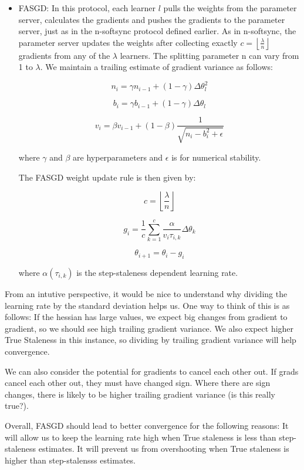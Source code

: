 \documentclass{article} %
\begin{document}
\begin{itemize}
\item FASGD: In this protocol, each learner $l$ pulls the weights from the parameter server,
  calculates the gradients and pushes the gradients to the parameter server,
  just as in the n-softsync protocol defined earlier.
  As in n-softsync, the parameter server updates
  the weights after collecting exactly
  $c = \left \lfloor{\frac{\lambda}{n}}\right \rfloor $
  gradients from any of the $\lambda$ learners.
  The splitting parameter n can vary from 1 to $\lambda$.
  We maintain a trailing estimate of gradient variance as follows:

  $$ n_i = \gamma n_{i-1} + (1 - \gamma) \Delta \theta_l^2 $$

  $$ b_i = \gamma b_{i-1} + (1 - \gamma) \Delta \theta_l $$

  $$ v_i = \beta  v_{i-1} + (1 - \beta)  \frac{1}{\sqrt{n_i - b_i^2 + \epsilon}}$$
  
  where $\gamma$ and $\beta$ are hyperparameters and $\epsilon$ is for numerical
  stability.

  The FASGD weight update rule is then given by:

  $$c = \left \lfloor{\frac{\lambda}{n}}\right \rfloor $$

  $$  g_i = \frac{1}{c} \sum_{k = 1}^{c} \frac{\alpha}{v_i \tau_{i,k}}\Delta \theta_k$$

  $$ \theta_{i + 1} = \theta_{i} - g_i $$

  where $\alpha(\tau_{i,k})$ is the step-staleness dependent learning rate.  
  
\end{itemize}
From an intutive perspective, it would be nice to understand why
dividing the learning rate by the standard deviation helps us.
One way to think of this is as follows:
If the hessian has large values, we expect big changes from gradient to gradient,
so we should see high trailing gradient variance.
We also expect higher True Staleness in this instance,
so dividing by trailing gradient variance will help convergence.

We can also consider the potential for gradients to cancel each other out.
If grads cancel each other out, they must have changed sign.
Where there are sign changes, there is likely to be higher trailing gradient
variance (is this really true?).

Overall, FASGD should lead to better convergence for the following reasons:
It will allow us to keep the learning rate high when True staleness is less than step-staleness estimates.
It will prevent us from overshooting when True staleness is higher than step-stalensss estimates.
\end{document}
